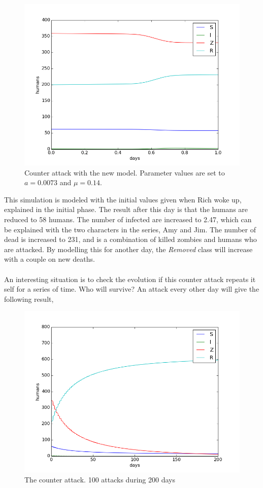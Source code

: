 \documentclass[%
twoside,                 %
final,                   %
10pt]{article}
\begin{document}
\begin{figure}[ht]
  \centerline{\includegraphics[width=0.9\linewidth]{plots/WD_zombie_counter_2.png}}
  \caption{
  Counter attack with the new model. Parameter values are set to $a=0.0073$ and $\mu=0.14$.
  }
\end{figure}


This simulation is modeled with the initial values given when Rich woke up, explained in the initial phase. The result after this day is that the humans are reduced to 58 humans. The number of infected are increased to 2.47, which can be explained with the two characters in the series, Amy and Jim. The number of dead is increased to 231, and is a combination of killed zombies and humans who are attacked. By modelling this for another day, the \emph{Removed} class will increase with a couple on new deaths. 
\\
\\
An interesting situation is to check the evolution if this counter attack repeats it self for a series of time. Who will survive? An attack every other day will give the following result,


\begin{figure}[ht]
  \centerline{\includegraphics[width=0.9\linewidth]{plots/WD_zombie_counter_series.png}}
  \caption{
  The counter attack. 100 attacks during 200 days
  }
\end{figure}
\end{document}
